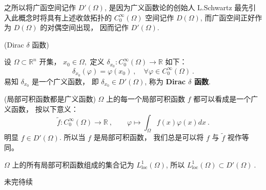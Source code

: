之所以将广函空间记作 $D'(\Omega)$, 是因为广义函数论的创始人 L.Schwartz 最先引入此概念时将具有上述收敛拓扑的
$C_{0}^{\infty}(\Omega)$ 空间记作 $D(\Omega)$, 而广函空间正好作为 $D(\Omega)$
的对偶空间出现， 因而记作 $D'(\Omega)$. 
\begin{example}{(Dirac $\delta$ 函数)
}

设 $\Omega\subset\mathbb{R}^{n}$ 开集， $x_{0}\in\Omega,$ 定义 $\delta_{x_{0}}:C_{0}^{\infty}(\Omega)\rightarrow\mathbb{R}$
如下： 
\[
\delta_{x_{0}}(\varphi)=\varphi(x_{0})~,\quad\forall\varphi\in C_{0}^{\infty}(\Omega)~.
\]
易知 $\delta_{x_{0}}$ 是一个广义函数， 即 $\delta_{x_{0}}\in D'(\Omega)$, 称为
\textbf{Dirac $\delta$ 函数}. 
\end{example}

\begin{example}{(局部可积函数都是广义函数)}
$\Omega$ 上的每一个局部可积函数 $f$ 都可以看成是一个广义函数， 按以下意义： 
\[
\tilde{f}:C_{0}^{\infty}(\Omega)\rightarrow\mathbb{R}~,\quad\quad\varphi\mapsto{\displaystyle \int_{\Omega}f(x)\varphi(x)dx}~.
\]
明显 $f\in D'(\Omega)$. 所以当 $f$ 是局部可积函数， 我们总是可以将 $f$ 与 $\tilde{f}$
视作等同。 

$\Omega$ 上的所有局部可积函数组成的集合记为 $L_{\mathrm{loc}}^1(\Omega)$, 所以
$L_{\mathrm{loc}}^1(\Omega)\subset D'(\Omega)~.$
\end{example}

未完待续
